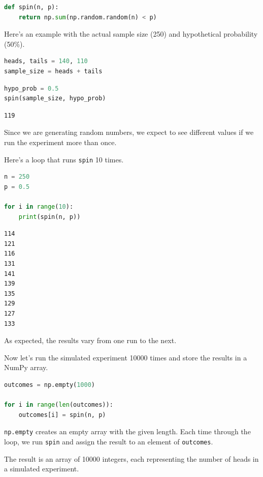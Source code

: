 \begin{lstlisting}[language=Python,style=source]
def spin(n, p):
    return np.sum(np.random.random(n) < p)
\end{lstlisting}

Here's an example with the actual sample size (250) and hypothetical
probability (50\%).

\begin{lstlisting}[language=Python,style=source]
heads, tails = 140, 110
sample_size = heads + tails
\end{lstlisting}

\begin{lstlisting}[language=Python,style=source]
hypo_prob = 0.5
spin(sample_size, hypo_prob)
\end{lstlisting}

\begin{lstlisting}[style=output]
119
\end{lstlisting}

Since we are generating random numbers, we expect to see different
values if we run the experiment more than once.

Here's a loop that runs \passthrough{\lstinline!spin!} 10 times.

\begin{lstlisting}[language=Python,style=source]
n = 250
p = 0.5

for i in range(10):
    print(spin(n, p))
\end{lstlisting}

\begin{lstlisting}[style=output]
114
121
116
131
141
139
135
129
127
133
\end{lstlisting}

As expected, the results vary from one run to the next.

Now let's run the simulated experiment 10000 times and store the results
in a NumPy array.

\begin{lstlisting}[language=Python,style=source]
outcomes = np.empty(1000)

for i in range(len(outcomes)):
    outcomes[i] = spin(n, p)
\end{lstlisting}

\passthrough{\lstinline!np.empty!} creates an empty array with the given
length. Each time through the loop, we run
\passthrough{\lstinline!spin!} and assign the result to an element of
\passthrough{\lstinline!outcomes!}.

The result is an array of 10000 integers, each representing the number
of heads in a simulated experiment.

